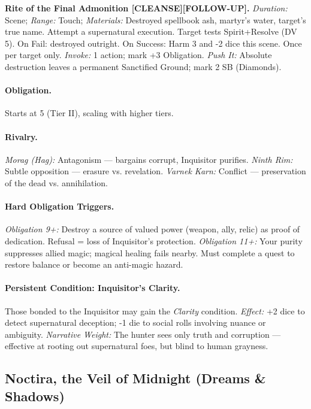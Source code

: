 \documentclass[11pt]{article}
\begin{document}
\textbf{Rite of the Final Admonition [CLEANSE][FOLLOW-UP].}
\emph{Duration:} Scene; \emph{Range:} Touch; \emph{Materials:} Destroyed spellbook ash, martyr’s water, target’s true name.
Attempt a supernatural execution. Target tests Spirit+Resolve (DV 5). On Fail: destroyed outright. On Success: Harm 3 and -2 dice this scene. Once per target only.
\emph{Invoke:} 1 action; mark +3 Obligation.
\emph{Push It:} Absolute destruction leaves a permanent Sanctified Ground; mark 2 SB (Diamonds).

\paragraph{Obligation.}
Starts at 5 (Tier II), scaling with higher tiers.

\paragraph{Rivalry.}
\emph{Morag (Hag):} Antagonism --- bargains corrupt, Inquisitor purifies.
\emph{Ninth Rim:} Subtle opposition --- erasure vs. revelation.
\emph{Varnek Karn:} Conflict --- preservation of the dead vs. annihilation.

\paragraph{Hard Obligation Triggers.}
\emph{Obligation 9+:} Destroy a source of valued power (weapon, ally, relic) as proof of dedication. Refusal = loss of Inquisitor’s protection.
\emph{Obligation 11+:} Your purity suppresses allied magic; magical healing fails nearby. Must complete a quest to restore balance or become an anti-magic hazard.

\paragraph{Persistent Condition: Inquisitor’s Clarity.}
Those bonded to the Inquisitor may gain the \emph{Clarity} condition.
\emph{Effect:} +2 dice to detect supernatural deception; -1 die to social rolls involving nuance or ambiguity.
\emph{Narrative Weight:} The hunter sees only truth and corruption --- effective at rooting out supernatural foes, but blind to human grayness.

\subsection{Noctira, the Veil of Midnight (Dreams \& Shadows)}
\end{document}
